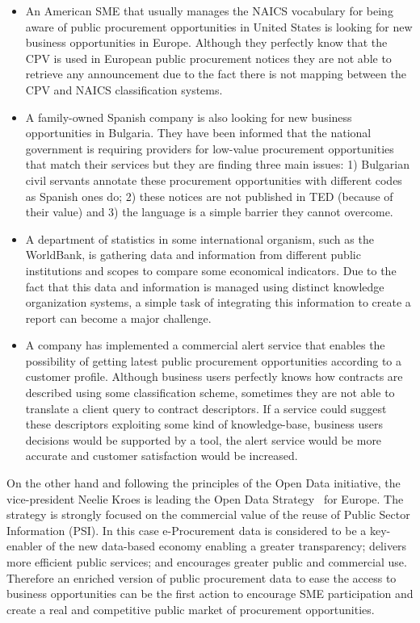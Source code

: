 \begin{itemize}
 \item An American SME that usually manages the NAICS vocabulary for being aware of public procurement 
opportunities in United States is looking for new business opportunities in Europe. Although they perfectly 
know that the CPV is used in European public procurement notices they are not able to retrieve 
any announcement due to the fact there is not mapping between the CPV and NAICS classification systems.
\item A family-owned Spanish company is also looking for new business opportunities in Bulgaria. They have been informed 
that the national government is requiring providers for low-value procurement opportunities that match their services but they 
are finding three main issues: 1) Bulgarian civil servants annotate these procurement opportunities with different codes as Spanish ones do; 2) 
these notices are not published in TED (because of their value) and 3) the language is a simple barrier they cannot overcome.
\item A department of statistics in some international organism, such as the WorldBank, is gathering data and information 
from different public institutions and scopes to compare some economical indicators. Due to the fact that this data and information is managed 
using distinct knowledge organization systems, a simple task of integrating this information to create a report can become a major challenge.
\item A company has implemented a commercial alert service that enables the possibility of getting latest public 
procurement opportunities according to a customer profile. Although business users perfectly knows how contracts are described using 
some classification scheme, sometimes they are not able to translate a client query to contract descriptors. If a 
service could suggest these descriptors exploiting some kind of knowledge-base, business users decisions would be supported by a tool, 
the alert service would be more accurate and customer satisfaction would be increased.
\end{itemize}

On the other hand and following the principles of the Open Data initiative, the vice-president Neelie Kroes is 
leading the Open Data Strategy~\cite{d2003} for Europe. The strategy is strongly focused on the commercial 
value of the reuse of Public Sector Information (PSI). In this case e-Procurement data is considered to be 
a key-enabler of the new data-based economy enabling a greater transparency; delivers more efficient public services; and encourages 
greater public and commercial use. Therefore an enriched version of public procurement data to ease the access 
to business opportunities can be the first action to encourage SME participation and create a real and competitive 
public market of procurement opportunities. 


